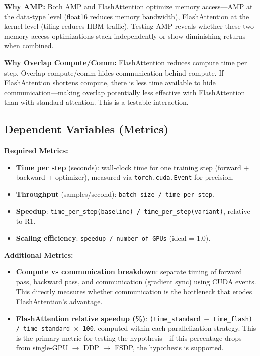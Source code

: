 \documentclass[12pt, a4paper]{article}
\begin{document}
\vspace{1em}
\textbf{Why AMP:}
Both AMP and FlashAttention optimize memory access---AMP at the data-type level (float16 reduces memory bandwidth), FlashAttention at the kernel level (tiling reduces HBM traffic). Testing AMP reveals whether these two memory-access optimizations stack independently or show diminishing returns when combined.

\vspace{1em}
\textbf{Why Overlap Compute/Comm:}
FlashAttention reduces compute time per step. Overlap compute/comm hides communication behind compute. If FlashAttention shortens compute, there is less time available to hide communication---making overlap potentially less effective with FlashAttention than with standard attention. This is a testable interaction.

\subsection{Dependent Variables (Metrics)}

\textbf{Required Metrics:}
\begin{itemize}
    \item \textbf{Time per step} (seconds): wall-clock time for one training step (forward + backward + optimizer), measured via \texttt{torch.cuda.Event} for precision.
    \item \textbf{Throughput} (samples/second): \texttt{batch\_size / time\_per\_step}.
    \item \textbf{Speedup}: \texttt{time\_per\_step(baseline) / time\_per\_step(variant)}, relative to R1.
    \item \textbf{Scaling efficiency}: \texttt{speedup / number\_of\_GPUs} (ideal = 1.0).
\end{itemize}

\vspace{1em}
\textbf{Additional Metrics:}
\begin{itemize}
    \item \textbf{Compute vs communication breakdown}: separate timing of forward pass, backward pass, and communication (gradient sync) using CUDA events. This directly measures whether communication is the bottleneck that erodes FlashAttention's advantage.
    \item \textbf{FlashAttention relative speedup (\%)}: \texttt{(time\_standard $-$ time\_flash) / time\_standard $\times$ 100}, computed within each parallelization strategy. This is the primary metric for testing the hypothesis---if this percentage drops from single-GPU $\rightarrow$ DDP $\rightarrow$ FSDP, the hypothesis is supported.
\end{itemize}
\end{document}
